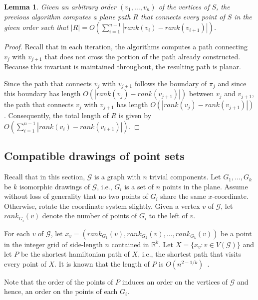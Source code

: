 \documentclass[a4paper, 11pt]{article}
\newtheorem{lemma}[theorem]{Lemma}
\begin{document}
\begin{lemma}\label{lemma:Compatible augmentation for trivial components}
Given an arbitrary order $(v_1, \ldots, v_n)$ of the vertices of $S$, the previous algorithm computes a plane path $R$ that connects every point of $S$ in the given order such that 
$|R| = O\left(\sum_{i=1}^{n-1} |rank(v_i) - rank(v_{i+1})| \right)$. 
\end{lemma}
\begin{proof}
Recall that in each iteration, the algorithms computes a path connecting $v_j$ with $v_{j+1}$ that does not cross the portion of the path already constructed. Because this invariant is maintained throughout, the resulting path is planar.

Since the path that connects $v_j$ with $v_{j+1}$ follows the boundary of $\pi_j$ and since this boundary has length $O(|rank(v_j) - rank(v_{j+1})|)$ between $v_j$ and $v_{j+1}$, the path that connects $v_j$ with $v_{j+1}$ has length $O(|rank(v_j) - rank(v_{j+1})|)$. Consequently,  the total length of $R$ is given by $O\left(\sum_{i=1}^{n-1} |rank(v_i) - rank(v_{i+1}) |\right)$.
\end{proof}



\subsection{Compatible drawings of point sets}
Recall that in this section, $\mathcal G$ is a graph with $n$ trivial components.
Let $G_1, \ldots, G_k$ be $k$ isomorphic drawings of $\mathcal G$, i.e., $G_i$ is a set of $n$ points in the plane.
Assume without loss of generality that no two points of $G_i$ share the same $x$-coordinate. Otherwise, rotate the coordinate system slightly.
Given a vertex $v$ of $\mathcal G$, let $rank_{G_i}(v)$ denote the number of points of $G_i$ to the left of $v$.

For each $v$ of $\mathcal G$, let $x_v = (rank_{G_1}(v), rank_{G_2}(v), \ldots, rank_{G_k}(v))$ be a point in the integer grid of side-length $n$ contained in $\mathbb{R}^k$.
Let $X = \{x_v : v\in V(\mathcal G)\}$ and let $P$ be the shortest hamiltonian path of $X$, i.e., the shortest path that visits every point of $X$.
It is known that the length of $P$ is $O(n^{2-1/k})$~\cite{}.

Note that the order of the points of $P$ induces an order on the vertices of $\mathcal G$ and hence, an order on the points of each $G_i$. 
\end{document}
